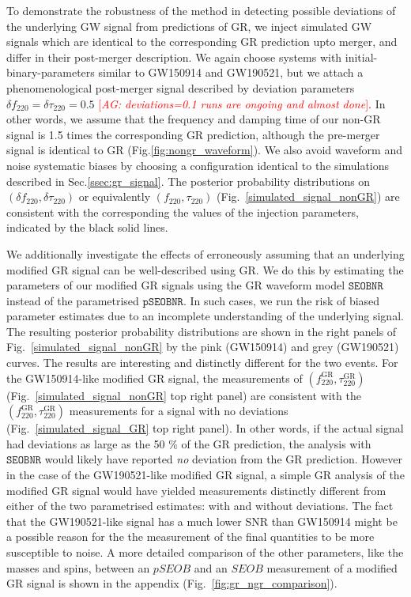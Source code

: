 \documentclass[twocolumn,prd,superscriptaddress,amsfonts,amssymb,amsmath,preprintnumbers]{revtex4-1}
\newcommand{\abhi}[1]{\textcolor{red}{[\textit{AG: #1}]}}
\newcommand{\df}[1]{\delta f_{\text{#1}}}
\newcommand{\dtau}[1]{\delta \tau_{\text{#1}}}
\newcommand{\fngr}[1]{f_{\text{#1}}}
\newcommand{\taungr}[1]{\tau_{\text{#1}}}
\newcommand{\fgr}[1]{f ^{\text{GR}}_{\text{#1}}}
\newcommand{\taugr}[1]{\tau ^{\text{GR}}_{\text{#1}}}
\newcommand{\pSEOB}{\texttt{pSEOBNR}}
\newcommand{\SEOB}{\texttt{SEOBNR}}
\begin{document}
To demonstrate the robustness of the method in detecting possible deviations of the underlying GW signal from predictions of GR, we inject simulated GW signals which are identical to the corresponding GR prediction upto merger, and differ in their post-merger description. We again choose systems with initial-binary-parameters similar to GW150914 and GW190521, but we attach a phenomenological post-merger signal described by deviation parameters $\df{220} = \dtau{220} = 0.5$ \abhi{deviations=0.1 runs are ongoing and almost done}. In other words, we assume that the frequency and damping time of our non-GR signal is 1.5 times the corresponding GR prediction, although the pre-merger signal is identical to GR (Fig.\ref{fig:nongr_waveform}). We also avoid waveform and noise systematic biases by choosing a configuration identical to the simulations described in Sec.\ref{ssec:gr_signal}. The posterior probability distributions on $(\df{220}, \dtau{220})$ or equivalently $(\fngr{220}, \taungr{220})$ (Fig.~\ref{simulated_signal_nonGR}) are consistent with the corresponding the values of the injection parameters, indicated by the black solid lines. 

We additionally investigate the effects of erroneously assuming that an underlying modified GR signal can be well-described using GR. We do this by estimating the parameters of our modified GR signals using the GR waveform model $\SEOB$ instead of the parametrised $\pSEOB$. In such cases, we run the risk of biased parameter estimates due to an incomplete understanding of the underlying signal. The resulting posterior probability distributions are shown in the right panels of Fig.~\ref{simulated_signal_nonGR} by the pink (GW150914) and grey (GW190521) curves. The results are interesting and distinctly different for the two events. For the GW150914-like modified GR signal, the measurements of $(\fgr{220}, \taugr{220})$ (Fig.~\ref{simulated_signal_nonGR} top right panel) are consistent with the $(\fgr{220}, \taugr{220})$ measurements for a signal with no deviations (Fig.~\ref{simulated_signal_GR} top right panel). In other words, if the actual signal had deviations as large as the 50 \% of the GR prediction, the analysis with $\SEOB$ would likely have reported \emph{no} deviation from the GR prediction. However in the case of the GW190521-like modified GR signal, a simple GR analysis of the modified GR signal would have yielded measurements distinctly different from either of the two parametrised estimates: with and without deviations. The fact that the GW190521-like signal has a much lower SNR than GW150914 might be a possible reason for the the measurement of the final quantities to be more susceptible to noise. A more detailed comparison of the other parameters, like the masses and spins, between an $pSEOB$ and an $SEOB$ measurement of a modified GR signal is shown in the appendix (Fig.~\ref{fig:gr_ngr_comparison}).
\end{document}
